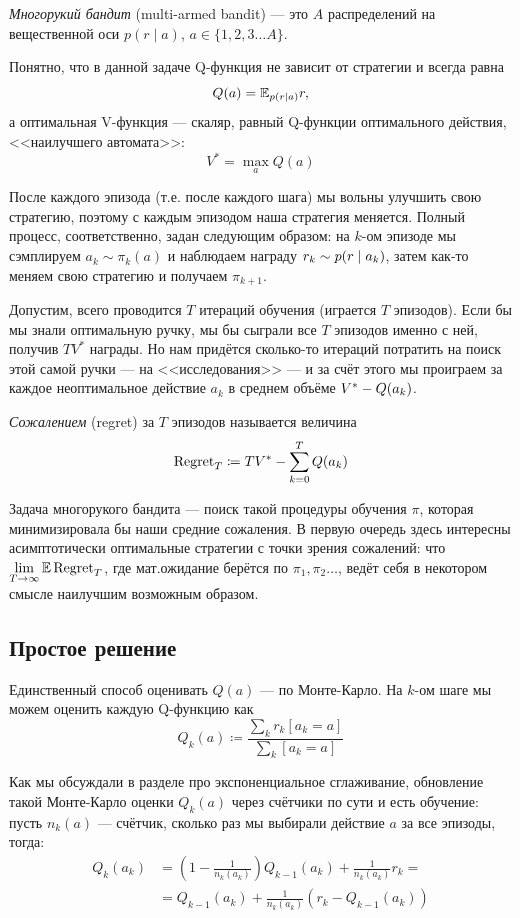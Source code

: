 \begin{definition}
\emph{Многорукий бандит} (multi-armed bandit) --- это $A$ распределений на вещественной оси $p(r \mid a)$, $a \in \{1,2,3 \dots A\}$.
\end{definition}

Понятно, что в данной задаче Q-функция не зависит от стратегии и всегда равна
$$Q(a) = \mathbb{E}_{p(r \mid a)} r,$$
а оптимальная V-функция --- скаляр, равный Q-функции оптимального действия, <<наилучшего автомата>>:
$$V^* = \max\limits_a Q(a)$$

После каждого эпизода (т.е. после каждого шага) мы вольны улучшить свою стратегию, поэтому с каждым эпизодом наша стратегия меняется. Полный процесс, соответственно, задан следующим образом: на $k$-ом эпизоде мы сэмплируем $a_k \sim \pi_k(a)$ и наблюдаем награду $r_k \HM\sim p(r \HM\mid a_k)$, затем как-то меняем свою стратегию и получаем $\pi_{k+1}$. 

Допустим, всего проводится $T$ итераций обучения (играется $T$ эпизодов). Если бы мы знали оптимальную ручку, мы бы сыграли все $T$ эпизодов именно с ней, получив $TV^*$ награды. Но нам придётся сколько-то итераций потратить на поиск этой самой ручки --- на <<исследования>> --- и за счёт этого мы проиграем за каждое неоптимальное действие $a_k$ в среднем объёме $V^* \HM- Q(a_k)$.

\begin{definition}
\emph{Сожалением} (regret) за $T$ эпизодов называется величина
$$\operatorname{Regret}_T \coloneqq T V^* - \sum_{k=0}^T Q(a_k)$$
\end{definition}

Задача многорукого бандита --- поиск такой процедуры обучения $\pi$, которая минимизировала бы наши средние сожаления. В первую очередь здесь интересны асимптотически оптимальные стратегии с точки зрения сожалений: что $\lim\limits_{T \to \infty} \mathbb{E} \operatorname{Regret}_T$, где мат.ожидание берётся по $\pi_1, \pi_2 \dots$, ведёт себя в некотором смысле наилучшим возможным образом.

\subsection{Простое решение}

Единственный способ оценивать $Q(a)$ --- по Монте-Карло. На $k$-ом шаге мы можем оценить каждую Q-функцию как
$$Q_k(a) \coloneqq \frac{\sum_k r_k [a_k = a]}{\sum_k [a_k = a]}$$

Как мы обсуждали в разделе про экспоненциальное сглаживание, обновление такой Монте-Карло оценки $Q_k(a)$ через счётчики по сути и есть обучение: пусть $n_k(a)$ --- счётчик, сколько раз мы выбирали действие $a$ за все эпизоды, тогда:
\begin{align*}
Q_k(a_k) &= \left( 1 - \frac{1}{n_k(a_k)} \right)Q_{k-1}(a_k) + \frac{1}{n_k(a_k)} r_k = \\
&= Q_{k-1}(a_k) + \frac{1}{n_k(a_k)} \left( r_k - Q_{k-1}(a_k) \right)
\end{align*}


